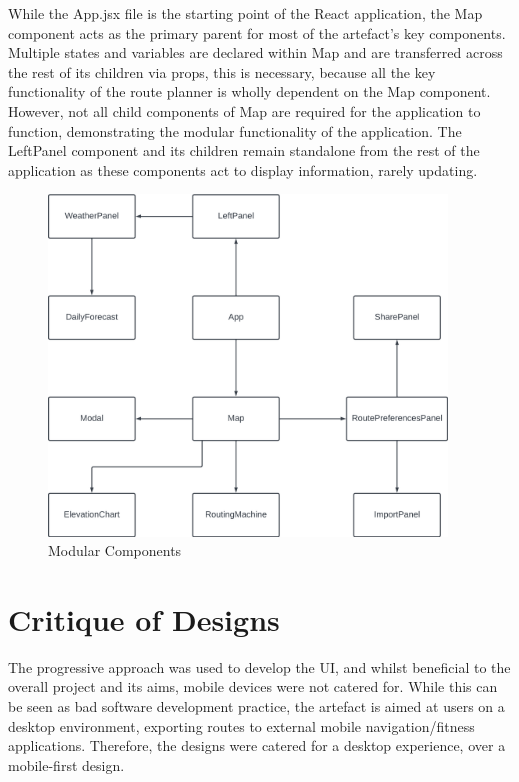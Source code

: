 While the App.jsx file is the starting point of the React application, the Map component acts as the primary parent for most of the artefact's key components. Multiple states and variables are declared within Map and are transferred across the rest of its children via props, this is necessary, because all the key functionality of the route planner is wholly dependent on the Map component. However, not all child components of Map are required for the application to function, demonstrating the modular functionality of the application. The LeftPanel component and its children remain standalone from the rest of the application as these components act to display information, rarely updating.

\begin{figure}[!ht]
  \centering
  \includegraphics[width=400px]{figures/components.png}
  \caption{Modular Components}
  \label{fig:components}
\end{figure}

\clearpage
\section{Critique of Designs}
\label{design:critique}

The progressive approach was used to develop the UI, and whilst beneficial to the overall project and its aims, mobile devices were not catered for. While this can be seen as bad software development practice, the artefact is aimed at users on a desktop environment, exporting routes to external mobile navigation/fitness applications. Therefore, the designs were catered for a desktop experience, over a mobile-first design.

